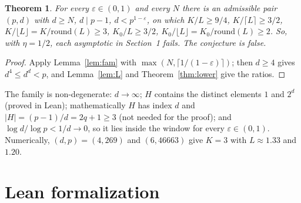 \documentclass[11pt]{article}
\newtheorem{theorem}{Theorem}
\theoremstyle{definition}
\begin{document}
\begin{theorem}\label{thm:main}
For every $\varepsilon\in(0,1)$ and every $N$ there is an admissible pair $(p,d)$ with $d\ge N$,
$d\mid p-1$, $d<p^{1-\varepsilon}$, on which $K/L\ge 9/4$, $K/\lceil L\rceil\ge3/2$,
$K/\lfloor L\rfloor=K/\mathrm{round}(L)\ge3$, $K_0/L\ge3/2$, $K_0/\lfloor L\rfloor=K_0/\mathrm{round}(L)\ge2$.
So, with $\eta=1/2$, each asymptotic in Section~1 fails. The conjecture is false.
\end{theorem}
\begin{proof}
Apply Lemma~\ref{lem:fam} with $\max(N,\lceil 1/(1-\varepsilon)\rceil)$; then $d\ge4$ gives
$d^4\le d^d<p$, and Lemma~\ref{lem:L} and Theorem~\ref{thm:lower} give the ratios.
\end{proof}

The family is non-degenerate: $d\to\infty$; $H$ contains the distinct elements $1$ and $2^d$ (proved
in Lean); mathematically $H$ has index $d$ and $|H|=(p-1)/d=2q+1\ge3$ (not needed for the proof); and
$\log d/\log p<1/d\to0$, so it lies inside the window for every $\varepsilon\in(0,1)$. Numerically,
$(d,p)=(4,269)$ and $(6,46663)$ give $K=3$ with $L\approx1.33$ and $1.20$.

\section{Lean formalization}
\end{document}
